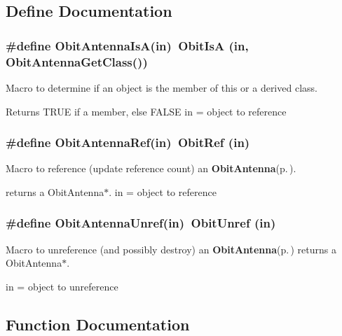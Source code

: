 \subsection{Define Documentation}
\subsubsection{\setlength{\rightskip}{0pt plus 5cm}\#define Obit\-Antenna\-Is\-A(in)\ Obit\-Is\-A (in, Obit\-Antenna\-Get\-Class())}\label{ObitAntenna_8h_a2}


Macro to determine if an object is the member of this or a derived class. 

Returns TRUE if a member, else FALSE in = object to reference 
\subsubsection{\setlength{\rightskip}{0pt plus 5cm}\#define Obit\-Antenna\-Ref(in)\ Obit\-Ref (in)}\label{ObitAntenna_8h_a1}


Macro to reference (update reference count) an {\bf Obit\-Antenna}{\rm (p.\,\pageref{structObitAntenna})}. 

returns a Obit\-Antenna$\ast$. in = object to reference 
\subsubsection{\setlength{\rightskip}{0pt plus 5cm}\#define Obit\-Antenna\-Unref(in)\ Obit\-Unref (in)}\label{ObitAntenna_8h_a0}


Macro to unreference (and possibly destroy) an {\bf Obit\-Antenna}{\rm (p.\,\pageref{structObitAntenna})} returns a Obit\-Antenna$\ast$. 

in = object to unreference 

\subsection{Function Documentation}
